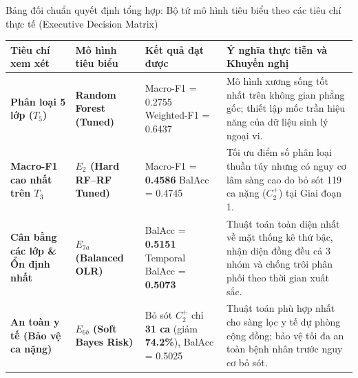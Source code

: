 \begin{table}{Bảng đối chuẩn quyết định tổng hợp: Bộ tứ mô hình tiêu biểu theo các tiêu chí thực tế (Executive Decision Matrix)}
\centering
\footnotesize
\setlength{\tabcolsep}{4pt}
\label{tab:executive-decision-matrix}
\begin{tabularx}{\textwidth}{p{3.2cm} p{3.0cm} p{3.2cm} X}
\toprule
\textbf{Tiêu chí xem xét} & \textbf{Mô hình tiêu biểu} & \textbf{Kết quả đạt được} & \textbf{Ý nghĩa thực tiễn và Khuyến nghị} \\
\midrule
\textbf{Phân loại 5 lớp ($T_5$)} & \textbf{Random Forest (Tuned)} & Macro-F1 = 0.2755 \newline Weighted-F1 = 0.6437 & Mô hình xương sống tốt nhất trên không gian phẳng gốc; thiết lập mốc trần hiệu năng của dữ liệu sinh lý ngoại vi. \\
\midrule
\textbf{Macro-F1 cao nhất trên $T_3$} & \textbf{$E_2$ (Hard RF--RF Tuned)} & Macro-F1 = \textbf{0.4586} \newline BalAcc = 0.4745 & Tối ưu điểm số phân loại thuần túy nhưng có nguy cơ lâm sàng cao do bỏ sót 119 ca nặng ($C_2^+$) tại Giai đoạn 1. \\
\midrule
\textbf{Cân bằng các lớp \& Ổn định nhất} & \textbf{$E_{7a}$ (Balanced OLR)} & BalAcc = \textbf{0.5151} \newline Temporal BalAcc = \textbf{0.5073} & Thuật toán toàn diện nhất về mặt thống kê thứ bậc, nhận diện đồng đều cả 3 nhóm và chống trôi phân phối theo thời gian xuất sắc. \\
\midrule
\textbf{An toàn y tế (Bảo vệ ca nặng)} & \textbf{$E_{6b}$ (Soft Bayes Risk)} & Bỏ sót $C_2^+$ chỉ \textbf{31 ca} \newline (giảm \textbf{74.2\%}), BalAcc = 0.5025 & Thuật toán phù hợp nhất cho sàng lọc y tế dự phòng cộng đồng; bảo vệ tối đa an toàn bệnh nhân trước nguy cơ bỏ sót. \\
\bottomrule
\end{tabularx}
\end{table}

